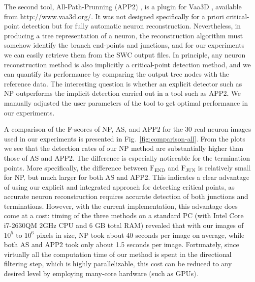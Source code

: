 The second tool, All-Path-Prunning (APP2) \cite{xiao2013app2}, is a plugin for Vaa3D \cite{peng2010v3d, peng2014extensible}, available from http://www.vaa3d.org/. It was not designed specifically for a priori critical-point detection but for fully automatic neuron reconstruction. Nevertheless, in producing a tree representation of a neuron, the reconstruction algorithm must somehow identify the branch end-points and junctions, and for our experiments we can easily retrieve them from the SWC output files. In principle, any neuron reconstruction method is also implicitly a critical-point detection method, and we can quantify its performance by comparing the output tree nodes with the reference data. The interesting question is whether an explicit detector such as NP outperforms the implicit detection carried out in a tool such as APP2. We manually adjusted the user parameters of the tool to get optimal performance in our experiments.

A comparison of the F-scores of NP, AS, and APP2 for the 30 real neuron images used in our experiments is presented in Fig.~\ref{fig:comparison-all}. From the plots we see that the detection rates of our NP method are substantially higher than those of AS and APP2. The difference is especially noticeable for the termination points. More specifically, the difference between $\textrm{F}_{\textrm{END}}$ and $\textrm{F}_{\textrm{JUN}}$ is relatively small for NP, but much larger for both AS and APP2. This indicates a clear advantage of using our explicit and integrated approach for detecting critical points, as accurate neuron reconstruction requires accurate detection of both junctions and terminations. However, with the current implementation, this advantage does come at a cost: timing of the three methods on a standard PC (with Intel Core i7-2630QM 2GHz CPU and 6 GB total RAM) revealed that with our images of $10^5$ to $10^6$ pixels in size, NP took about 40 seconds per image on average, while both AS and APP2 took only about 1.5 seconds per image. Fortunately, since virtually all the computation time of our method is spent in the directional filtering step, which is highly parallelizable, this cost can be reduced to any desired level by employing many-core hardware (such as GPUs).
